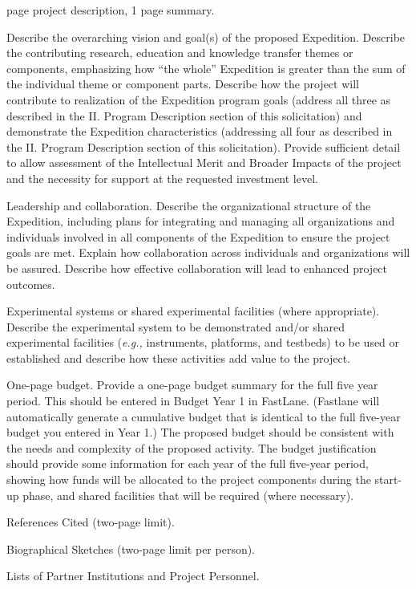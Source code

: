 \documentclass [10pt]{article}
\newcommand{\eg}{{\it e.g., }}
\begin{document}
\begin{outline}
 page project description, 1 page summary.

\1 Describe the overarching vision and goal(s) of the proposed Expedition.  Describe the contributing research, education and knowledge transfer themes or components, emphasizing how “the whole” Expedition is greater than the sum of the individual theme or component parts.  Describe how the project will contribute to realization of the Expedition program goals (address all three as described in the II. Program Description section of this solicitation) and demonstrate the Expedition characteristics (addressing all four as described in the II. Program Description section of this solicitation).  Provide sufficient detail to allow assessment of the Intellectual Merit and Broader Impacts of the project and the necessity for support at the requested investment level.  

\1 Leadership and collaboration. Describe the organizational structure of the Expedition, including plans for integrating and managing all organizations and individuals involved in all components of the Expedition to ensure the project goals are met.  Explain how collaboration across individuals and organizations will be assured.  Describe how effective collaboration will lead to enhanced project outcomes. 

\1 Experimental systems or shared experimental facilities (where appropriate).  Describe the experimental system to be demonstrated and/or shared experimental facilities (\eg instruments, platforms, and testbeds) to be used or established and describe how these activities add value to the project.

\1 One-page budget.  Provide a one-page budget summary for the full five year period.  This should be entered in Budget Year 1 in FastLane.  (Fastlane will automatically generate a cumulative budget that is identical to the full five-year budget you entered in Year 1.) The proposed budget should be consistent with the needs and complexity of the proposed activity. The budget justification should provide some information for each year of the full five-year period, showing how funds will be allocated to the project components during the start-up phase, and shared facilities that will be required (where necessary).

\1 References Cited (two-page limit). 

\1 Biographical Sketches (two-page limit per person).  

\1 Lists of  Partner Institutions and Project Personnel. 



\end{outline}
\end{document}
